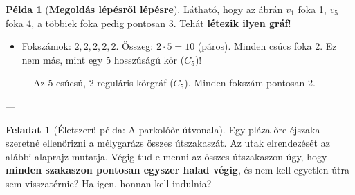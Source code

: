 \documentclass[a4paper,12pt]{article}
\theoremstyle{definition} %
\newtheorem*{problem}{Feladat}
\newtheorem*{example}{Példa}
\begin{document}
\begin{example}[\textbf{Megoldás lépésről lépésre}]
Látható, hogy az ábrán $v_1$ foka 1, $v_5$ foka 4, a többiek foka pedig pontosan 3. Tehát \textbf{létezik ilyen gráf}!

\begin{itemize}[leftmargin=2em]
    \item[(c)] Fokszámok: $2, 2, 2, 2, 2$. Összeg: $2 \cdot 5 = 10$ (páros). Minden csúcs foka 2. Ez nem más, mint egy 5 hosszúságú kör ($C_5$)!
\end{itemize}

\begin{figure}[H]
    \centering
    \caption{Az 5 csúcsú, 2-reguláris körgráf ($C_5$). Minden fokszám pontosan 2.}
    \label{fig:c5_graph}
\end{figure}
\end{example}

---

\begin{problem}[Életszerű példa: A parkolóőr útvonala]
Egy pláza őre éjszaka szeretné ellenőrizni a mélygarázs összes útszakaszát. Az utak elrendezését az alábbi alaprajz mutatja. Végig tud-e menni az összes útszakaszon úgy, hogy \textbf{minden szakaszon pontosan egyszer halad végig}, és nem kell egyetlen útra sem visszatérnie? Ha igen, honnan kell indulnia?
\end{problem}
\end{document}
